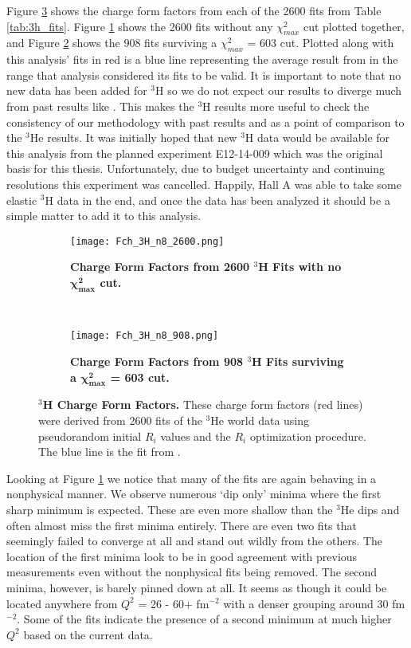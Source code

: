 Figure \ref{fig:3h_fch} shows the charge form factors from each of the 2600 fits from Table \ref{tab:3h_fits}. Figure \ref{fig:3h_fch_no_cut} shows the 2600 fits without any $\chi^2_{max}$ cut plotted together, and Figure \ref{fig:3h_fch_cut} shows the 908 fits surviving a $\chi^2_{max}$ = 603 cut. Plotted along with this analysis' fits in red is a blue line representing the average result from \cite{Article:Amroun} in the range that analysis considered its fits to be valid. It is important to note that no new data has been added for $^3$H so we do not expect our results to diverge much from past results like \cite{Article:Amroun}. This makes the $^3$H results more useful to check the consistency of our methodology with past results and as a point of comparison to the $^3$He results. It was initially hoped that new $^3$H data would be available for this analysis from the planned experiment E12-14-009 \cite{3h_proposal} which was the original basis for this thesis. Unfortunately, due to budget uncertainty and continuing resolutions this experiment was cancelled. Happily, Hall A was able to take some elastic $^3$H data in the end, and once the data has been analyzed it should be a simple matter to add it to this analysis.

\begin{figure}[!ht]
\begin{subfigure}{1.\textwidth}
  \centering
  \texttt{[image: Fch\_3H\_n8\_2600.png]}
  \caption{\bf{Charge Form Factors from 2600 $^3$H Fits with no $\boldsymbol{\chi^2_{max}}$ cut.}}
  \label{fig:3h_fch_no_cut}
\end{subfigure}\\
\begin{subfigure}{1.\textwidth}
  \centering
  \texttt{[image: Fch\_3H\_n8\_908.png]}
  \caption{\bf{Charge Form Factors from 908 $^3$H Fits surviving a $\boldsymbol{\chi^2_{max}}$ = 603 cut.}}
  \label{fig:3h_fch_cut}
\end{subfigure}
\caption[$^3$H Charge Form Factors] {
{\bf{$^3$H Charge Form Factors.}} These charge form factors (red lines) were derived from 2600 fits of the $^3$He world data using pseudorandom initial $R_i$ values and the $R_i$ optimization procedure. The blue line is the fit from \cite{Article:Amroun}.}
\label{fig:3h_fch}
\end{figure}

Looking at Figure \ref{fig:3h_fch_no_cut} we notice that many of the fits are again behaving in a nonphysical manner. We observe numerous `dip only' minima where the first sharp minimum is expected. These are even more shallow than the $^3$He dips and often almost miss the first minima entirely. There are even two fits that seemingly failed to converge at all and stand out wildly from the others. The location of the first minima look to be in good agreement with previous measurements even without the nonphysical fits being removed. The second minima, however, is barely pinned down at all. It seems as though it could be located anywhere from $Q^2$ = 26 - 60+ fm$^{-2}$ with a denser grouping around 30 fm$^{-2}$. Some of the fits indicate the presence of a second minimum at much higher $Q^2$ based on the current data. 

